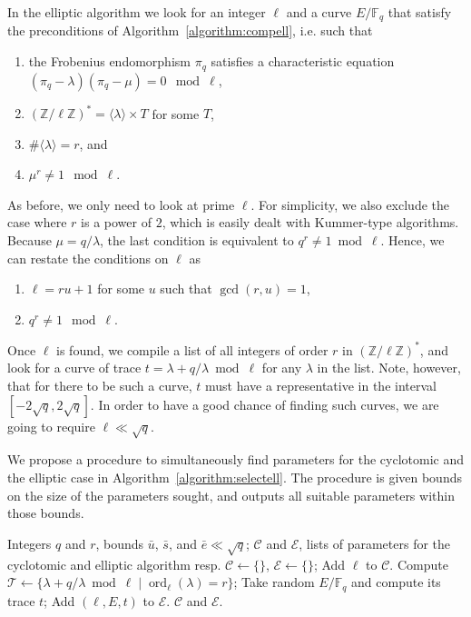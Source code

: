 \documentclass[12pt]{article}
\theoremstyle{plain}
\theoremstyle{definition}
\DeclareMathOperator{\order}{ord} %
\def\Z{\ensuremath{\mathbb{Z}}}
\def\F{\ensuremath{\mathbb{F}}}
\newcounter{algorithm}
\begin{document}
In the elliptic algorithm we look for an integer $\ell$ and a curve
$E/\F_q$ that satisfy the preconditions of
Algorithm~\ref{algorithm:compell}, i.e. such that 
\begin{enumerate}
\item the Frobenius endomorphism $\pi_q$ satisfies a characteristic
  equation $(\pi_q-\lambda)(\pi_q-\mu) = 0 \mod \ell$,
\item $(\Z/\ell\Z)^\ast = \langle\lambda\rangle\times T$ for some $T$,
\item $\#\langle\lambda\rangle=r$, and
\item $\mu^r\ne1\mod\ell$.
\end{enumerate}

As before, we only need to look at prime $\ell$. For simplicity, we
also exclude the case where $r$ is a power of $2$, which is easily
dealt with Kummer-type algorithms. Because $\mu=q/\lambda$, the last
condition is equivalent to $q^r\ne1\bmod\ell$. Hence, we can restate
the conditions on $\ell$ as
\begin{enumerate}
\item $\ell = ru+1$ for some $u$ such that $\gcd(r,u)=1$,
\item $q^r\ne1\mod\ell$.
\end{enumerate}
Once $\ell$ is found, we compile a list of all integers of order $r$
in $(\Z/\ell\Z)^\ast$, and look for a curve of trace
$t=\lambda+q/\lambda\bmod\ell$ for any $\lambda$ in the list. Note,
however, that for there to be such a curve, $t$ must have a
representative in the interval $[-2\sqrt{q},2\sqrt{q}]$. In order to
have a good chance of finding such curves, we are going to require
$\ell\ll\sqrt{q}$.

We propose a procedure to simultaneously find parameters for the
cyclotomic and the elliptic case in
Algorithm~\ref{algorithm:selectell}. The procedure is given bounds on
the size of the parameters sought, and outputs all suitable parameters
within those bounds.

\begin{algorithm}
    \label{algorithm:selectell}
    \begin{algorithmic}[1]
      \REQUIRE Integers $q$ and $r$, bounds $\bar{u}$, $\bar{s}$, and $\bar{e}\ll\sqrt{q}$;
      \ENSURE $\mathcal{C}$ and $\mathcal{E}$, lists of parameters for the cyclotomic and elliptic algorithm resp.
      \STATE $\mathcal{C}\leftarrow\{\}$, $\mathcal{E}\leftarrow\{\}$;
      \IF{$\order_\ell(q)=rs$ with $s\le\bar{s}$ and $\gcd(rs,u/s)=1$}
      \STATE Add $\ell$ to $\mathcal{C}$.
      \ENDIF
      \STATE Compute $\mathcal{T} \leftarrow \{\lambda + q/\lambda \bmod\ell \;|\; \order_\ell(\lambda)=r\}$;
      \REPEAT
      \STATE Take random $E/\F_q$ and compute its trace $t$;
      \STATE Add $(\ell,E,t)$ to $\mathcal{E}$.
      \ENDIF
      \ENDIF
      \ENDFOR
      \RETURN $\mathcal{C}$ and $\mathcal{E}$.
    \end{algorithmic}
\end{algorithm}
\end{document}
